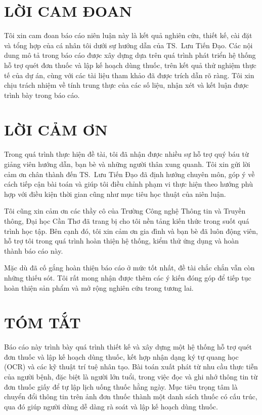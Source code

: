 \documentclass[12pt,a4paper]{report}
\newcommand{\gvhd}{TS.\ Lưu Tiến Đạo}
\begin{document}
\hypersetup{pageanchor=true}


\chapter*{LỜI CAM ĐOAN}

Tôi xin cam đoan báo cáo niên luận này là kết quả nghiên cứu, thiết kế, cài đặt và tổng hợp của cá nhân tôi dưới sự hướng dẫn của \gvhd. Các nội dung mô tả trong báo cáo được xây dựng dựa trên quá trình phát triển hệ thống hỗ trợ quét đơn thuốc và lập kế hoạch dùng thuốc, trên kết quả thử nghiệm thực tế của dự án, cùng với các tài liệu tham khảo đã được trích dẫn rõ ràng. Tôi xin chịu trách nhiệm về tính trung thực của các số liệu, nhận xét và kết luận được trình bày trong báo cáo.

\chapter*{LỜI CẢM ƠN}

Trong quá trình thực hiện đề tài, tôi đã nhận được nhiều sự hỗ trợ quý báu từ giảng viên hướng dẫn, bạn bè và những người thân xung quanh. Tôi xin gửi lời cảm ơn chân thành đến \gvhd{} đã định hướng chuyên môn, góp ý về cách tiếp cận bài toán và giúp tôi điều chỉnh phạm vi thực hiện theo hướng phù hợp với điều kiện thời gian cũng như mục tiêu học thuật của niên luận.

Tôi cũng xin cảm ơn các thầy cô của Trường Công nghệ Thông tin và Truyền thông, Đại học Cần Thơ đã trang bị cho tôi nền tảng kiến thức trong suốt quá trình học tập. Bên cạnh đó, tôi xin cảm ơn gia đình và bạn bè đã luôn động viên, hỗ trợ tôi trong quá trình hoàn thiện hệ thống, kiểm thử ứng dụng và hoàn thành báo cáo này.

Mặc dù đã cố gắng hoàn thiện báo cáo ở mức tốt nhất, đề tài chắc chắn vẫn còn những thiếu sót. Tôi rất mong nhận được thêm các ý kiến đóng góp để tiếp tục hoàn thiện sản phẩm và mở rộng nghiên cứu trong tương lai.

\chapter*{TÓM TẮT}

Báo cáo này trình bày quá trình thiết kế và xây dựng một hệ thống hỗ trợ quét đơn thuốc và lập kế hoạch dùng thuốc, kết hợp nhận dạng ký tự quang học (OCR) và các kỹ thuật trí tuệ nhân tạo. Bài toán xuất phát từ nhu cầu thực tiễn của người bệnh, đặc biệt là người lớn tuổi, trong việc đọc và ghi nhớ thông tin từ đơn thuốc giấy để tự lập lịch uống thuốc hằng ngày. Mục tiêu trọng tâm là chuyển đổi thông tin trên ảnh đơn thuốc thành một danh sách thuốc có cấu trúc, qua đó giúp người dùng dễ dàng rà soát và lập kế hoạch dùng thuốc.
\end{document}
